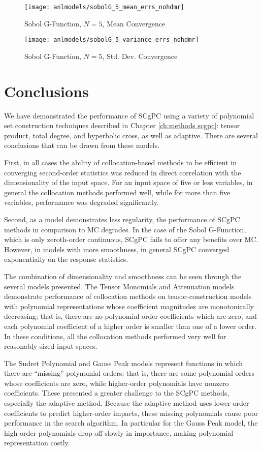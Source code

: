 \begin{figure}[H]
  \centering
  \texttt{[image: anlmodels/sobolG\_5\_mean\_errs\_nohdmr]}
  \caption{Sobol G-Function, $N=5$, Mean Convergence}
  \label{fig:sobolG mean errors 5}
\end{figure}
\begin{figure}[H]
  \centering
  \texttt{[image: anlmodels/sobolG\_5\_variance\_errs\_nohdmr]}
  \caption{Sobol G-Function, $N=5$, Std. Dev. Convergence}
  \label{fig:sobolG var errors 5}
\end{figure}




\section{Conclusions}
We have demonstrated the performance of SCgPC using a variety of polynomial set construction techniques
described in Chapter \ref{ch:methods scgpc}: tensor product, total degree, and hyperbolic cross, as well as
adaptive.  There are several conclusions that can be drawn from these models.

First, in all cases the ability of collocation-based methods to be efficient in converging second-order
statistics was reduced in direct correlation with the dimensionality of the input space.  For an input space
of five or less variables, in general the collocation methods performed well, while for more than five
variables, performance was degraded significantly.

Second, as a model demonstrates less regularity, the performance of SCgPC methods in comparison to MC
degrades.  In the case of the Sobol G-Function, which is only zeroth-order continuous, SCgPC fails to offer
any benefits over MC.  However, in models with more smoothness, in general SCgPC converged exponentially on
the response statistics.

The combination of dimensionality and smoothness can be seen through the several models presented.
The Tensor Monomials and Attenuation models demonstrate performance of collocation methods on
tensor-construction models with polynomial representations whose coefficient magnitudes are monotonically 
decreasing; that is, there
are no polynomial order coefficients which are zero, and each polynomial coefficient of a higher order is
smaller than one of a lower order.  In these conditions, all the collocation methods performed very well for
reasonably-sized input spaces.

The Sudret Polynomial and Gauss Peak models represent functions in which there are ``missing'' polynomial
orders; that is, there are some polynomial orders whose coefficients are zero, while higher-order polynomials
have nonzero coefficients.  These presented a greater challenge to the SCgPC methods, especially the adaptive
method.  Because the adaptive method uses lower-order coefficients to predict higher-order impacts, these
missing polynomials cause poor performance in the search algorithm.  In particular for the Gauss Peak model,
the high-order polynomials drop off slowly in importance, making polynomial representation costly.

